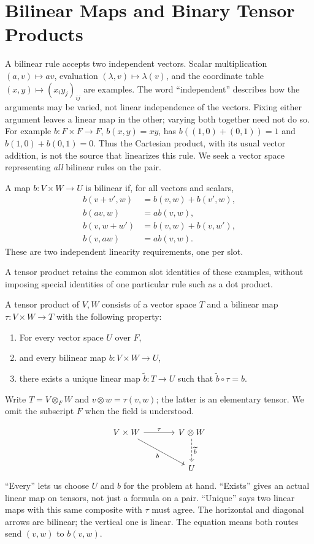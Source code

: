 \section{Bilinear Maps and Binary Tensor Products}
A bilinear rule accepts two independent vectors. Scalar multiplication
$(a,v)\mapsto av$, evaluation $(\lambda,v)\mapsto\lambda(v)$, and the
coordinate table $(x,y)\mapsto(x_iy_j)_{ij}$ are examples. The word
``independent'' describes how the arguments may be varied, not linear
independence of the vectors. Fixing either argument leaves a linear map
in the other; varying both together need not do so.
For example $b:F\times F\to F$, $b(x,y)=xy$, has
$b((1,0)+(0,1))=1$ and $b(1,0)+b(0,1)=0$. Thus the Cartesian product,
with its usual vector addition, is not the source that linearizes this rule.
We seek a vector space representing \emph{all} bilinear rules on the pair.
\begin{definition}[Bilinearity]
A map $b:V\times W\to U$ is bilinear if, for all vectors and scalars,
\begin{align*}
b(v+v',w)&=b(v,w)+b(v',w),\\
b(av,w)&=ab(v,w),\\
b(v,w+w')&=b(v,w)+b(v,w'),\\
b(v,aw)&=ab(v,w).
\end{align*}
These are two independent linearity requirements, one per slot.
\end{definition}
A tensor product retains the common slot identities of these examples,
without imposing special identities of one particular rule such as a dot product.
\begin{definition}\label{def:tensor-universal}
A tensor product of $V,W$ consists of a vector space $T$ and a bilinear map
$\tau:V\times W\to T$ with the following property:
\begin{enumerate}
\item For every vector space $U$ over $F$,
\item and every bilinear map $b:V\times W\to U$,
\item there exists a unique linear map $\widetilde b:T\to U$ such that
$\widetilde b\circ\tau=b$.
\end{enumerate}
Write $T=V\otimes_F W$ and $v\otimes w=\tau(v,w)$; the latter is an
elementary tensor. We omit the subscript $F$ when the field is understood.
\end{definition}
\[
\begin{tikzcd}[column sep=large,row sep=large]
V\times W\arrow[r,"\tau"]\arrow[dr,"b"']&V\otimes W\arrow[d,dashed,"\widetilde b"]\\
&U
\end{tikzcd}
\]
``Every'' lets us choose $U$ and $b$ for the problem at hand. ``Exists''
gives an actual linear map on tensors, not just a formula on a pair.
``Unique'' says two linear maps with this same composite with $\tau$ must
agree. The horizontal and diagonal arrows are bilinear; the vertical one is
linear. The equation means both routes send $(v,w)$ to $b(v,w)$.

